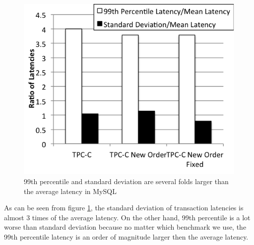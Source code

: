 \begin{figure}[h]
\centering
\includegraphics[scale=0.7]{plots/mysql-ratio}
\caption{99th percentile and standard deviation are several folds larger than
the average latency in MySQL}
\label{fig:mysql-ratio}
\end{figure}

As can be seen from figure \ref{fig:mysql-ratio}, the standard deviation of
transaction latencies is almost 3 times of the average latency. On the other 
hand, 99th percentile is a lot worse than standard deviation because no matter
which benchmark we use, the 99th percentile latency is an order of magnitude
larger then the average latency.

